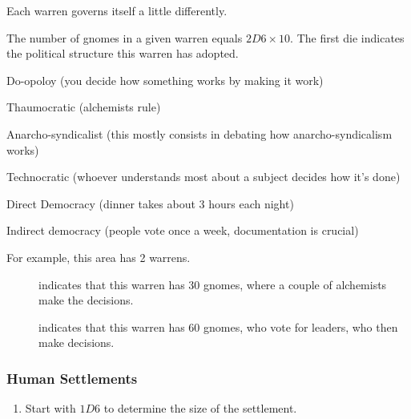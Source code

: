 \begin{multicols}{2}
Each warren governs itself a little differently.

The number of gnomes in a given warren equals $2D6\times 10$.
The first die indicates the political structure this warren has adopted.

\begin{dlist}
  \item
  Do-opoloy (you decide how something works by making it work)
  \item
  Thaumocratic (alchemists rule)
  \item
  Anarcho-syndicalist (this mostly consists in debating how anarcho-syndicalism works)
  \item
  Technocratic (whoever understands most about a subject decides how it's done)
  \item
  Direct Democracy (dinner takes about 3 hours each night)
  \item
  Indirect democracy (people vote once a week, documentation is crucial)
\end{dlist}

\begin{exampletext}
  For example, this area has 2 warrens.
  \begin{description}
    \item[]
    indicates that this warren has 30 gnomes, where a couple of alchemists make the decisions.
    \item[]
    indicates that this warren has 60 gnomes, who vote for leaders, who then make decisions.
  \end{description}
  
\end{exampletext}

\subsubsection{Human Settlements}
\label{humanPoint}

\begin{enumerate}
  \item
  Start with $1D6$ to determine the size of the settlement.
\end{enumerate}
\end{multicols}
